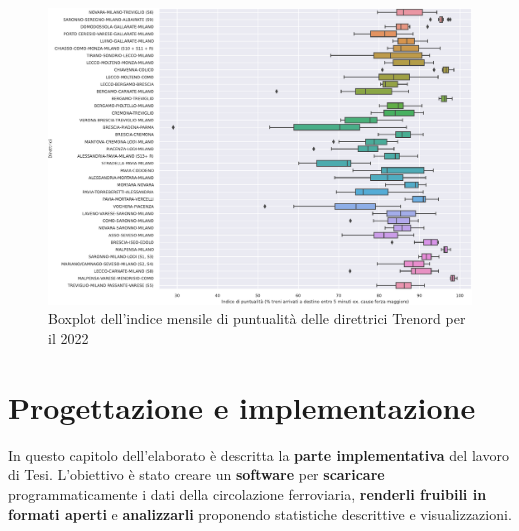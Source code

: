 \documentclass[12pt,italian]{report}
\begin{document}
\begin{figure}
    \centering
    \includegraphics[width=1\textwidth]{images/lomb_boxplot.pdf}
    \caption{Boxplot dell'indice mensile di puntualità delle
        direttrici Trenord per il 2022}
    \label{figure:lomb_boxplot}
\end{figure}

\chapter{Progettazione e implementazione}
\label{progettazione}

In questo capitolo dell'elaborato è descritta la \textbf{parte
    implementativa} del lavoro di Tesi.  L'obiettivo è stato creare un
\textbf{software} per \textbf{scaricare} programmaticamente i dati
della circolazione ferroviaria, \textbf{renderli fruibili in formati
    aperti}
e \textbf{analizzarli} proponendo statistiche descrittive e
visualizzazioni.
\end{document}
